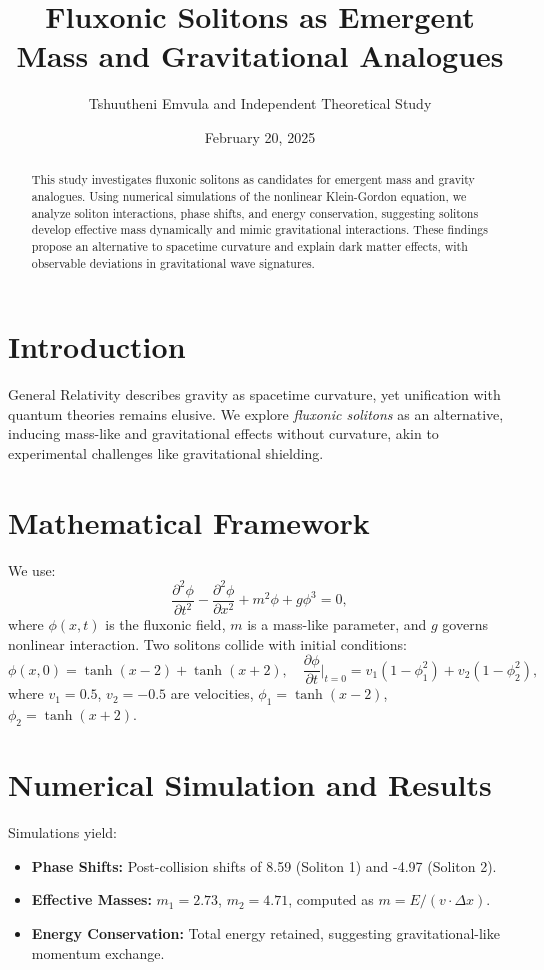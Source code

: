 \documentclass{article}
\title{Fluxonic Solitons as Emergent Mass and Gravitational Analogues}
\author{Tshuutheni Emvula and Independent Theoretical Study}
\date{February 20, 2025}
\begin{document}
\maketitle

\begin{abstract}
This study investigates fluxonic solitons as candidates for emergent mass and gravity analogues. Using numerical simulations of the nonlinear Klein-Gordon equation, we analyze soliton interactions, phase shifts, and energy conservation, suggesting solitons develop effective mass dynamically and mimic gravitational interactions. These findings propose an alternative to spacetime curvature and explain dark matter effects, with observable deviations in gravitational wave signatures.
\end{abstract}

\section{Introduction}
General Relativity describes gravity as spacetime curvature, yet unification with quantum theories remains elusive. We explore \textit{fluxonic solitons} as an alternative, inducing mass-like and gravitational effects without curvature, akin to experimental challenges like gravitational shielding.

\section{Mathematical Framework}
We use:
\begin{equation}
\frac{\partial^2 \phi}{\partial t^2} - \frac{\partial^2 \phi}{\partial x^2} + m^2 \phi + g \phi^3 = 0,
\end{equation}
where \(\phi(x,t)\) is the fluxonic field, \(m\) is a mass-like parameter, and \(g\) governs nonlinear interaction. Two solitons collide with initial conditions:
\begin{equation}
\phi(x,0) = \tanh(x - 2) + \tanh(x + 2), \quad \frac{\partial \phi}{\partial t} \Big|_{t=0} = v_1 (1 - \phi_1^2) + v_2 (1 - \phi_2^2),
\end{equation}
where \(v_1 = 0.5\), \(v_2 = -0.5\) are velocities, \(\phi_1 = \tanh(x - 2)\), \(\phi_2 = \tanh(x + 2)\).

\section{Numerical Simulation and Results}
Simulations yield:
\begin{itemize}
    \item \textbf{Phase Shifts:} Post-collision shifts of 8.59 (Soliton 1) and -4.97 (Soliton 2).
    \item \textbf{Effective Masses:} \(m_1 = 2.73\), \(m_2 = 4.71\), computed as \(m = E / (v \cdot \Delta x)\).
    \item \textbf{Energy Conservation:} Total energy retained, suggesting gravitational-like momentum exchange.
\end{itemize}
\end{document}
